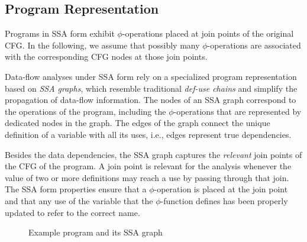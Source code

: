 \subsection{Program Representation}

Programs in SSA form exhibit $\phi$-operations placed at join
points of the original CFG. In the following, we assume that possibly many
$\phi$-operations are associated with the corresponding CFG nodes at those
join points.

Data-flow analyses under SSA form rely on a specialized program representation
based on \emph{SSA graphs}, which resemble traditional \emph{def-use chains} and
simplify the propagation of data-flow information. The nodes of an SSA graph
correspond to the operations of the program, including the 
$\phi$-operations that are represented by dedicated nodes in the graph. The
edges of the graph connect the unique definition of a variable with all its
uses, i.e., edges represent true dependencies.

Besides the data dependencies, the SSA graph captures the \emph{relevant} join 
points of the CFG of the program. A join point
is relevant for the analysis whenever the value of two or more definitions may
reach a use by passing through that join. The SSA form properties ensure that
a $\phi$-operation is placed at the join point and that any use of the variable
that the $\phi$-function defines has been properly updated to refer to the
correct name.

\begin{figure}[t]
  \hfill
  \hfill
  \caption{Example program and its SSA graph}
  \label{novillo:fig:ssa_graph}
\end{figure}

